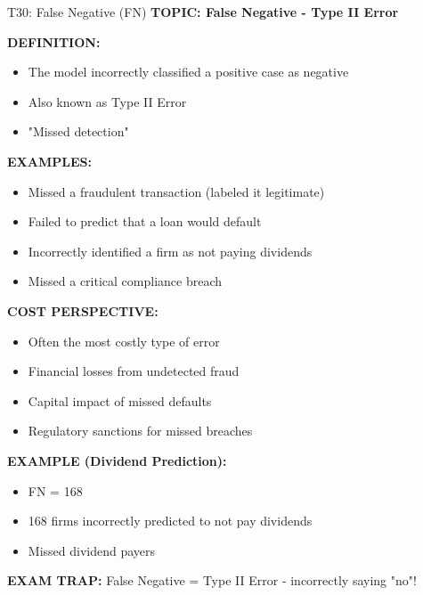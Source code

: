 \documentclass[8pt]{beamer}
\begin{document}
	\begin{frame}{T30: False Negative (FN)}
		\fontsize{6.5}{7.5}\selectfont
		\textbf{TOPIC: False Negative - Type II Error}
		
		\vspace{0.1cm}
		\textbf{DEFINITION:}
		\begin{itemize}
			\item The model incorrectly classified a positive case as negative
			\item Also known as Type II Error
			\item "Missed detection"
		\end{itemize}
		
		\vspace{0.1cm}
		\textbf{EXAMPLES:}
		\begin{itemize}
			\item Missed a fraudulent transaction (labeled it legitimate)
			\item Failed to predict that a loan would default
			\item Incorrectly identified a firm as not paying dividends
			\item Missed a critical compliance breach
		\end{itemize}
		
		\vspace{0.1cm}
		\textbf{COST PERSPECTIVE:}
		\begin{itemize}
			\item Often the most costly type of error
			\item Financial losses from undetected fraud
			\item Capital impact of missed defaults
			\item Regulatory sanctions for missed breaches
		\end{itemize}
		
		\vspace{0.1cm}
		\textbf{EXAMPLE (Dividend Prediction):}
		\begin{itemize}
			\item FN = 168
			\item 168 firms incorrectly predicted to not pay dividends
			\item Missed dividend payers
		\end{itemize}
		
		\textcolor{myred}{\textbf{EXAM TRAP:}} False Negative = \textcolor{myblue}{Type II Error} - incorrectly saying "no"!
	\end{frame}
	
\end{document}
